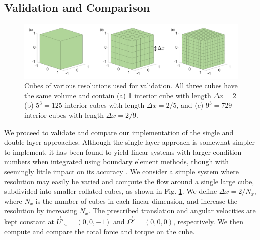 	\subsection{Validation and Comparison}

\begin{figure}[ht]
	\begin{center}
		\includegraphics[scale=0.45]{./figures/fig_cube_all_dx}
	\end{center}
	\caption{Cubes of various resolutions used for validation. All three cubes have the same volume and contain (a) 1 interior cube with length $\Delta x = 2$ (b) $5^3=125$  interior cubes with length $\Delta x = 2/5$, and (c) $9^3 = 729$  interior cubes with length $\Delta x = 2/9$.}
	\label{fig_test_cubes}
\end{figure}
We proceed to validate and compare our implementation of the single and double-layer approaches. Although the single-layer approach is somewhat simpler to implement, it has been found to yield linear systems with larger condition numbers when integrated using boundary element methods, though with seemingly little impact on its accuracy \cite{youngren_stokes_1975,ingber_comparison_1999}.
We consider a simple system where resolution may easily be varied and compute the flow around a single large cube, subdivided into smaller collated cubes, as shown in Fig. \ref{fig_test_cubes}.
We define $\Delta x  = 2 / N_x$, where $N_x$ is the number of cubes in each linear dimension, and increase the resolution by increasing $N_x$.
The prescribed translation and angular velocities are kept constant at $\vec{U}'_a = (0,0,-1)$ and $\vec{\Omega}'= (0,0,0)$, respectively. We then compute and compare the total force and torque on the cube. 
\par
